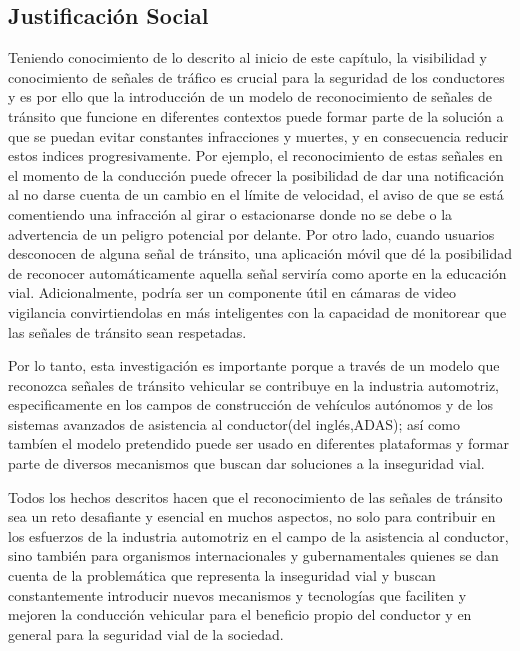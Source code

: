 	\subsection{Justificación Social}
	
	Teniendo conocimiento de lo descrito al inicio de este capítulo, la visibilidad y conocimiento de señales de tráfico es crucial para la seguridad de los conductores y es por ello que la introducción de un modelo de reconocimiento de señales de tránsito que funcione en diferentes contextos puede formar parte de la solución a que se puedan evitar constantes infracciones y muertes, y en consecuencia reducir estos indices progresivamente. Por ejemplo, el reconocimiento de estas señales en el momento de la conducción puede ofrecer la posibilidad de dar una notificación al no darse cuenta de un cambio en el límite de velocidad, el aviso de que se está comentiendo una infracción al girar o estacionarse donde no se debe o la advertencia de un peligro potencial por delante. Por otro lado, cuando usuarios desconocen de alguna señal de tránsito, una aplicación móvil que dé la posibilidad de reconocer automáticamente aquella señal serviría como aporte en la educación vial. Adicionalmente, podría ser un componente útil en cámaras de video vigilancia convirtiendolas en más inteligentes con la capacidad de monitorear que las señales de tránsito sean respetadas.\vskip 0.2cm

	Por lo tanto, esta investigación es importante porque a través de un modelo que reconozca señales de tránsito vehicular se contribuye en la industria automotriz, especificamente en los campos de construcción de vehículos autónomos y de los sistemas avanzados de asistencia al conductor(del inglés,ADAS); así como tambíen el modelo pretendido puede ser usado en diferentes plataformas y formar parte de diversos mecanismos que buscan dar soluciones a la inseguridad vial. \vskip 0.2cm
	
	Todos los hechos descritos hacen que el reconocimiento de las señales de tránsito sea un reto desafiante y esencial en muchos aspectos, no solo para contribuir en los esfuerzos de la industria automotriz en el campo de la asistencia al conductor, sino también para organismos internacionales y gubernamentales quienes se dan cuenta de la problemática que representa la inseguridad vial y buscan constantemente introducir nuevos mecanismos y tecnologías que faciliten y mejoren la conducción vehicular para el beneficio propio del conductor y en general para la seguridad vial de la sociedad.




